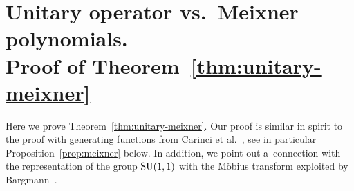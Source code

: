\documentclass[10pt,a4paper]{amsart}
\numberwithin{equation}{section}
\newcommand{\1}{\mathbbm{1}}
\begin{document}
\section[Unitary operator vs.\ Meixner polynomials. Proof of Theorem~\ref{thm:unitary-meixner}]{Unitary operator vs.\ Meixner polynomials.\\ Proof of Theorem~\ref{thm:unitary-meixner}}
\label{sec:generating}

Here we prove Theorem~\ref{thm:unitary-meixner}. Our proof is similar in spirit to the proof with generating functions from Carinci et al.~\cite{carinci2019orthogonal}, see in particular Proposition~\ref{prop:meixner} below. In addition, we point out a~connection with the representation of the group ${\rm SU}(1,1)$ with the M{\"o}bius transform exploited by Bargmann~\cite[Section 9]{bargmann1947}.
\end{document}
